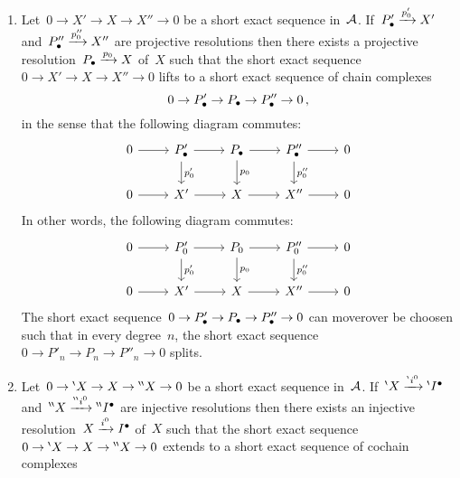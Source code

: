 \begin{lemma}
  \label{horseshoe lemma}
  \leavevmode
  \begin{enumerate}
    \item
      \label{projective horseshoe}
      Let~$0 \to X' \to X \to X'' \to 0$ be a short exact sequence in~$\mathcal{A}$.
      If~$P_\bullet' \xrightarrow{p'_0} X'$ and~$P_\bullet'' \xrightarrow{p''_0} X''$ are projective resolutions then there exists a projective resolution~$P_\bullet \xrightarrow{p_0} X$ of~$X$ such that the short exact sequence~$0 \to X' \to X \to X'' \to 0$ lifts to a short exact sequence of chain complexes
      \[
        0
        \to
        P_\bullet'
        \to
        P_\bullet
        \to
        P_\bullet''
        \to
        0 \,,
      \]
      in the sense that the following diagram commutes: 
      \[
        \begin{tikzcd}
            0
            \arrow{r}
          & \Pcc'
            \arrow{r}
            \arrow{d}[right]{p'_0}
          & \Pcc
            \arrow{r}
            \arrow{d}[right]{p_0}
          & \Pcc''
            \arrow{r}
            \arrow{d}[right]{p''_0}
          & 0
          \\
            0
            \arrow{r}
          & X'
            \arrow{r}
          & X
            \arrow{r}
          & X''
            \arrow{r}
          & 0
        \end{tikzcd}
      \]
      In other words, the following diagram commutes:
      \[
        \begin{tikzcd}
            0
            \arrow{r}
          & P'_0
            \arrow{r}
            \arrow{d}[right]{p'_0}
          & P_0
            \arrow{r}
            \arrow{d}[right]{p_0}
          & P''_0
            \arrow{r}
            \arrow{d}[right]{p''_0}
          & 0
          \\
            0
            \arrow{r}
          & X'
            \arrow{r}
          & X
            \arrow{r}
          & X''
            \arrow{r}
          & 0
        \end{tikzcd}
      \]
      The short exact sequence~$0 \to P_\bullet' \to P_\bullet \to P_\bullet'' \to 0$ can moverover be choosen such that in every degree~$n$, the short exact sequence~$0 \to P'_n \to P_n \to P''_n \to 0$ splits.
    \item
      \label{injective horseshoe}
      Let~$0 \to {}^{\backprime} X \to X \to {}^{\backprime \backprime} X \to 0$ be a short exact sequence in~$\mathcal{A}$.
      If~${}^{\backprime} X \xrightarrow{{}^{\backprime} i^0} {}^{\backprime}I^\bullet$ and~${}^{\backprime \backprime} X \xrightarrow{{}^{\backprime \backprime} i^0} {}^{\backprime \backprime}I^\bullet$ are injective resolutions then there exists an injective resolution~$X \xrightarrow{i^0} I^\bullet$ of~$X$ such that the short exact sequence~$0 \to {}^{\backprime} X \to X \to {}^{\backprime \backprime} X \to 0$ extends to a short exact sequence of cochain complexes

\end{enumerate}
\end{lemma}
